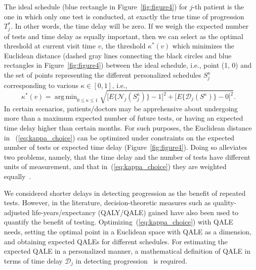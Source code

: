 \documentclass[AMA,STIX1COL]{WileyNJD-v2}
\DeclareMathOperator{\argmin}{arg\,min}
\begin{document}
The ideal schedule (blue rectangle in Figure~\ref{fig:figure4}) for $j$-th patient is the one in which only one test is conducted, at exactly the true time of progression $T^*_j$. In other words, the time delay will be zero. If we weigh the expected number of tests and time delay as equally important, then we can select as the optimal threshold at current visit time $v$, the threshold $\kappa^*(v)$ which minimizes the Euclidean distance (dashed gray lines connecting the black circles and blue rectangles in Figure~\ref{fig:figure4}) between the ideal schedule, i.e., point (1, 0) and the set of points representing the different personalized schedules $S^{\kappa}_j$ corresponding to various $\kappa \in [0, 1]$, i.e.,
\begin{equation}
\label{eq:kappa_choice}
\kappa^*(v) = \argmin_{0 \leq \kappa \leq 1} \sqrt{\Big[E\big\{\mathcal N_j(S^\kappa_j)\big\} - 1\Big]^2 + \Big[E\big\{\mathcal D_j(S^\kappa )\big\} - 0\Big]^2}.
\end{equation}
In certain scenarios, patients/doctors may be apprehensive about undergoing more than a maximum expected number of future tests, or having an expected time delay higher than certain months. For such purposes, the Euclidean distance in ~(\ref{eq:kappa_choice}) can be optimized under constraints on the expected number of tests or expected time delay (Figure~\ref{fig:figure4}). Doing so alleviates two problems, namely, that the time delay and the number of tests have different units of measurement, and that in~(\ref{eq:kappa_choice}) they are weighted equally~\citep{cook1994equivalence}.

We considered shorter delays in detecting progression as the benefit of repeated tests. However, in the literature, decision-theoretic measures such as quality-adjusted life-years/expectancy (QALY/QALE) gained \citep{sassi2006calculating} have also been used to quantify the benefit of testing. Optimizing~(\ref{eq:kappa_choice}) with QALE needs, setting the optimal point in a Euclidean space with QALE as a dimension, and obtaining expected QALEs for different schedules. For estimating the expected QALE in a personalized manner, a mathematical definition of QALE in terms of time delay $\mathcal{D}_j$ in detecting progression~\citep{de2017should} is required.
\end{document}
